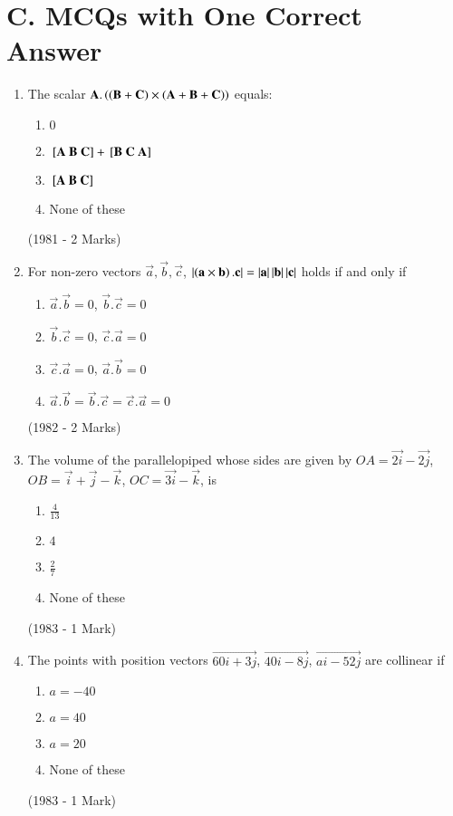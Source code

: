 \documentclass[journal,12pt,twocolumn]{IEEEtran}
\theoremstyle{remark}
\begin{document}
\section{C. MCQs with One Correct Answer}
\begin{enumerate}
\item The scalar $\mathbf{A}.\left(\left(\mathbf{B}+\mathbf{C})\times(\mathbf{A}+\mathbf{B}+\mathbf{C}\right)\right)$ equals:
\begin{enumerate}
\item  $0$
\item ${}\left[\mathbf{A}\ \mathbf{B}\ \mathbf{C}\right] + {}\left[\mathbf{B}\ \mathbf{C}\ \mathbf{A}\right]$
\item $\sbrak{\vec{A}\ \vec{B}\ \vec{C}}$
\item None of these
\end{enumerate}
\hfill (1981 - 2 Marks)

\item For non-zero vectors $\vec{a}, \vec{b}, \vec{c}$, $\left\vert\left(\mathbf{a}\times\mathbf{b}\right).\mathbf{c}\right\vert = \left\vert\mathbf{a}\right\vert\left\vert\mathbf{b}\right\vert\left\vert\mathbf{c}\right\vert$ holds if and only if
\begin{enumerate}
\item $\vec{a}.\vec{b}=0$, $\vec{b}.\vec{c}=0$
\item $\vec{b}.\vec{c}=0$, $\vec{c}.\vec{a}=0$
\item $\vec{c}.\vec{a}=0$, $\vec{a}.\vec{b}=0$
\item $\vec{a}.\vec{b}= \vec{b}.\vec{c}= \vec{c}.\vec{a}=0$
\end{enumerate}
\hfill (1982 - 2 Marks)

\item The volume of the parallelopiped whose sides are given by $OA =\vec{2i}-\vec{2j}$, $OB = \vec{i}+\vec{j}-\vec{k}$, $OC = \vec{3i}-\vec{k}$, is 
\begin{enumerate}
\item $\frac{4}{13}$
\item $4$
\item $\frac{2}{7}$
\item None of these
\end{enumerate}
\hfill (1983 - 1 Mark)

\item The points with position vectors $\vec{60i + 3j}$, $\vec{40i-8j}$, $\vec{ai-52j}$ are collinear if
\begin{enumerate}
\item $a=-40$
\item $a=40$
\item $a=20$
\item None of these
\end{enumerate}
\hfill (1983 - 1 Mark)


\end{enumerate}
\end{document}
